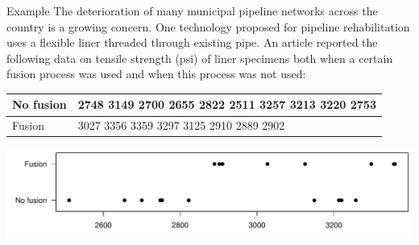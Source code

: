\documentclass[t,handout]{beamer}
\begin{document}
    \begin{frame}{Example}
    The deterioration of many municipal pipeline networks across the country is a growing concern. One technology proposed for pipeline rehabilitation uses a flexible liner
    threaded through existing pipe. An article reported the following data on tensile strength (psi) of liner specimens both when a certain fusion process was used and when this process was not used:
    
    \begin{center}
    \begin{tabular}{l|p{9cm}}
    No fusion &
    2748
    3149
    2700
    2655
    2822
    2511
    3257
    3213
    3220
    2753
    \\ \hline
    Fusion &
    3027
    3356
    3359
    3297
    3125
    2910
    2889
    2902
    \end{tabular}
    \end{center}
    
    \includegraphics[scale=.5]{ch9_dotplot.pdf}
    \end{frame}
    
\end{document}
